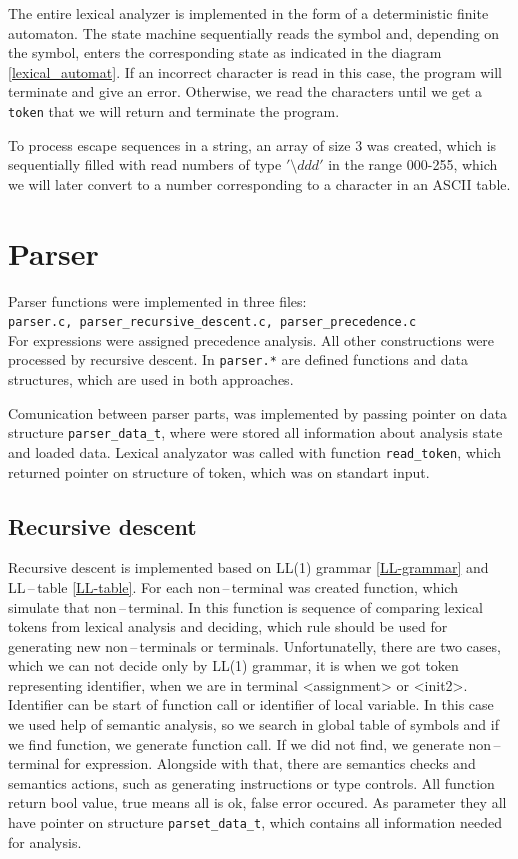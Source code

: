\documentclass[11pt]{article}
\begin{document}
The entire lexical analyzer is implemented in the form of a deterministic finite automaton. The state machine sequentially reads the symbol and, depending on the symbol, enters the corresponding state as indicated in the diagram \ref{lexical_automat}. If an incorrect character is read in this case, the program will terminate and give an error. Otherwise, we read the characters until we get a \texttt{token} that we will return and terminate the program.

To process escape sequences in a string, an array of size 3 was created, which is sequentially filled with read numbers of type $'\setminus{ddd}'$ in the range 000-255, which we will later convert to a number corresponding to a character in an ASCII table.



\section{Parser}
Parser functions were implemented in three files:\\ \texttt{parser.c, parser\_recursive\_descent.c, parser\_precedence.c} \\
For expressions were assigned precedence analysis. All other constructions were processed by recursive descent.
In \texttt{parser.*} are defined functions and data structures, which are used in both approaches.

Comunication between parser parts, was implemented by passing pointer on data structure \texttt{parser\_data\_t}, 
where were stored all information about analysis state and loaded data. Lexical analyzator was called with function \texttt{read\_token},
which returned pointer on structure of token, which was on standart input.

\subsection{Recursive descent}
Recursive descent is implemented based on LL(1) grammar \ref{LL-grammar} and LL\,--\,table \ref{LL-table}. For each non\,--\,terminal was created function,
which simulate that non\,--\,terminal. In this function is sequence of comparing lexical tokens from lexical analysis and deciding, which rule should be used for
generating new non\,--\,terminals or terminals. Unfortunatelly, there are two cases, which we can not decide only by LL(1) grammar, it is when we got token representing identifier, when we are 
in terminal <assignment> or <init2>. Identifier can be start of function call or identifier of local variable. In this case we used help of semantic analysis, so we search in global table 
of symbols and if we find function, we generate function call. If we did not find, we generate non\,--\,terminal for expression.
Alongside with that, there are semantics checks and semantics actions, such as generating instructions or type controls. All function return bool value, true means
all is ok, false error occured.
As parameter they all have pointer on structure \texttt{parset\_data\_t}, which contains all information needed for analysis. 
\end{document}
